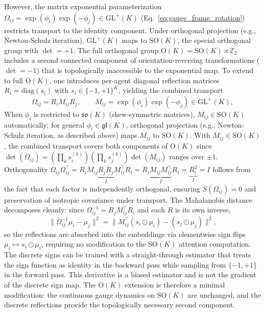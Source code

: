 \documentclass[twoside,11pt]{article}
\begin{document}
However, the matrix exponential parameterization $\Omega_{ij} = \exp(\phi_i)\exp(-\phi_j) \in \mathrm{GL}^+(K)$ (Eq.~\ref{eq:gauge_frame_rotation}) restricts transport to the identity component. Under orthogonal projection (e.g., Newton-Schulz iteration), $\mathrm{GL}^+(K)$ maps to $\mathrm{SO}(K)$, the special orthogonal group with $\det = +1$. The full orthogonal group $\mathrm{O}(K) = \mathrm{SO}(K) \rtimes \mathbb{Z}_2$ includes a second connected component of orientation-reversing transformations ($\det = -1$) that is topologically inaccessible to the exponential map. To extend to full $\mathrm{O}(K)$, one introduces per-agent diagonal reflection matrices $R_i = \mathrm{diag}(s_i)$ with $s_i \in \{-1,+1\}^K$, yielding the combined transport
%
\begin{equation}
\Omega_{ij} = R_i M_{ij} R_j, \qquad M_{ij} = \exp(\phi_i)\exp(-\phi_j) \in \mathrm{GL}^+(K),
\label{eq:ok_transport}
\end{equation}
%
When $\phi_i$ is restricted to $\mathfrak{so}(K)$ (skew-symmetric matrices), $M_{ij} \in \mathrm{SO}(K)$ automatically; for general $\phi_i \in \mathfrak{gl}(K)$, orthogonal projection (e.g., Newton-Schulz iteration, as described above) maps $M_{ij}$ to $\mathrm{SO}(K)$. With $M_{ij} \in \mathrm{SO}(K)$, the combined transport covers both components of $\mathrm{O}(K)$ since $\det(\Omega_{ij}) = (\prod_k s_i^{(k)})(\prod_k s_j^{(k)})\det(M_{ij})$ ranges over $\pm 1$. Orthogonality $\Omega_{ij}\Omega_{ij}^\top = R_i M_{ij} \underbrace{R_j R_j}_{I} M_{ij}^\top R_i = R_i \underbrace{M_{ij}M_{ij}^\top}_{I} R_i = \underbrace{R_i^2}_{I} = I$ follows from the fact that each factor is independently orthogonal, ensuring $S(\Omega_{ij}) = 0$ and preservation of isotropic covariance under transport. The Mahalanobis distance decomposes cleanly: since $\Omega_{ij}^{-1} = R_j M_{ij}^\top R_i$ and each $R$ is its own inverse,
%
\begin{equation}
\|\Omega_{ij}^{-1}\mu_i - \mu_j\|^2 = \|M_{ij}^\top(s_i \odot \mu_i) - (s_j \odot \mu_j)\|^2,
\label{eq:ok_mahalanobis}
\end{equation}
%
so the reflections are absorbed into the embeddings via elementwise sign flips $\mu_i \mapsto s_i \odot \mu_i$, requiring no modification to the $\mathrm{SO}(K)$ attention computation. The discrete signs can be trained with a straight-through estimator that treats the sign function as identity in the backward pass while sampling from $\{-1,+1\}$ in the forward pass. This derivative is a biased estimator and is not the gradient of the discrete sign map. The $\mathrm{O}(K)$ extension is therefore a minimal modification: the continuous gauge dynamics on $\mathrm{SO}(K)$ are unchanged, and the discrete reflections provide the topologically necessary second component.
\end{document}
